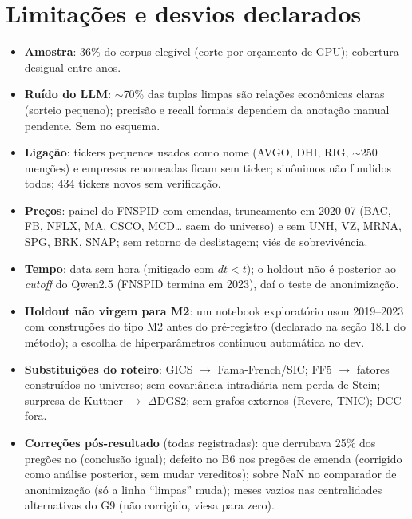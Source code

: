 \documentclass[11pt,a4paper]{article}
\begin{document}
\section{Limitações e desvios declarados}\label{sec:limitacoes}

\begin{itemize}
  \item \textbf{Amostra}: 36\% do corpus elegível (corte por orçamento de GPU); cobertura desigual entre anos.
  \item \textbf{Ruído do LLM}: $\sim$70\% das tuplas limpas são relações econômicas claras (sorteio pequeno);
        precisão e recall formais dependem da anotação manual pendente. Sem  no esquema.
  \item \textbf{Ligação}: tickers pequenos usados como nome (AVGO, DHI, RIG, $\sim$250 menções) e empresas
        renomeadas ficam sem ticker; sinônimos não fundidos todos; 434 tickers novos sem verificação.
  \item \textbf{Preços}: painel do FNSPID com emendas, truncamento em 2020-07 (BAC, FB, NFLX, MA, CSCO, MCD\ldots
        saem do universo) e sem UNH, VZ, MRNA, SPG, BRK, SNAP; sem retorno de deslistagem; viés de sobrevivência.
  \item \textbf{Tempo}: data sem hora (mitigado com $dt<t$); o holdout não é posterior ao \emph{cutoff} do Qwen2.5
        (FNSPID termina em 2023), daí o teste de anonimização.
  \item \textbf{Holdout não virgem para M2}: um notebook exploratório usou 2019--2023 com construções do tipo M2
        antes do pré-registro (declarado na seção 18.1 do método); a escolha de hiperparâmetros continuou
        automática no dev.
  \item \textbf{Substituições do roteiro}: GICS $\to$ Fama-French/SIC; FF5 $\to$ fatores construídos no universo; sem
        covariância intradiária nem perda de Stein; surpresa de Kuttner $\to$ $\Delta$DGS2; sem grafos externos
        (Revere, TNIC); DCC fora.
  \item \textbf{Correções pós-resultado} (todas registradas):  que derrubava 25\% dos pregões no
         (conclusão igual); defeito no B6 nos pregões de emenda (corrigido como análise posterior,
        sem mudar vereditos);  sobre NaN no comparador de anonimização (só a linha ``limpas'' muda);
        meses vazios nas centralidades alternativas do G9 (não corrigido, viesa para zero).
\end{itemize}
\end{document}
